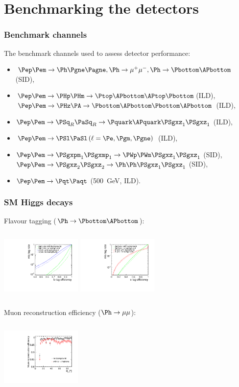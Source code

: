 \documentclass{beamer}
\begin{document}
\section{Benchmarking the detectors}
\begin{frame}
 \frametitle{Benchmark channels}
The benchmark channels used to assess detector performance:
\begin{itemize}
\item $\Pep\Pem \to \Ph \Pgne \Pagne, \Ph \to \mu^+\mu^-, \Ph \to
\Pbottom\APbottom$ (SID),
\item  $\Pep\Pem \to \PHp \PHm\to \Ptop\APbottom\APtop\Pbottom$(ILD),\\
$\Pep\Pem \to \PHz \PA\to\Pbottom\APbottom\Pbottom\APbottom$ (ILD),
\item $\Pep\Pem \to \PSq_R \PaSq_R\to\Pquark\APquark\PSgxz_1\PSgxz_1$ (ILD), 
\item $\Pep\Pem \to \PSl \PaSl \,(\ell = \Pe,\Pgm,\Pgne)$ (ILD), 
\item $\Pep\Pem \to \PSgxpm_1 \PSgxmp_1\to\PWp\PWm\PSgxz_1\PSgxz_1$ (SID),\\
$\Pep\Pem \to \PSgxz_2 \PSgxz_2\to \Ph\Ph\PSgxz_1\PSgxz_1$ (SID),
\item  $\Pep\Pem \to \Pqt \Paqt$ (500~GeV, ILD).
\end{itemize} 
\end{frame}
\begin{frame}
\frametitle{SM Higgs decays}
Flavour tagging ($\Ph\to\Pbottom\APbottom$):
\begin{columns}[c]
\column{4cm}
\centering
\includegraphics[width=4cm]{../SIDWorkshop/Light_Higgs_Flavour_Tag.pdf}
\column{4cm}
\centering
\includegraphics[width=4cm]{../SIDWorkshop/Light_Higgs_Flavour_Tag_C.pdf}
\end{columns}
Muon reconstruction efficiency ($\Ph\to\mu\mu$):
\begin{columns}[c]
\column{4cm}
\centering
\includegraphics[width=4cm]{../SIDWorkshop/MuonEfficiency2.pdf}
\column{4cm}
\centering
\end{columns}
\end{frame}
\end{document}
